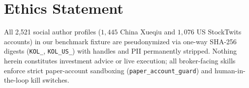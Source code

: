 \section*{Ethics Statement}
\vspace{-0.14cm}
All 2,521 social author profiles ($1{,}445$ China Xueqiu and $1{,}076$ US StockTwits accounts) in our benchmark fixture are pseudonymized via one-way SHA-256 digests (\texttt{KOL\_<10-hex>}, \texttt{KOL\_US\_<10-hex>}) with handles and PII permanently stripped. Nothing herein constitutes investment advice or live execution; all broker-facing skills enforce strict paper-account sandboxing (\texttt{paper\_account\_guard}) and human-in-the-loop kill switches.
\vspace{-0.20cm}
